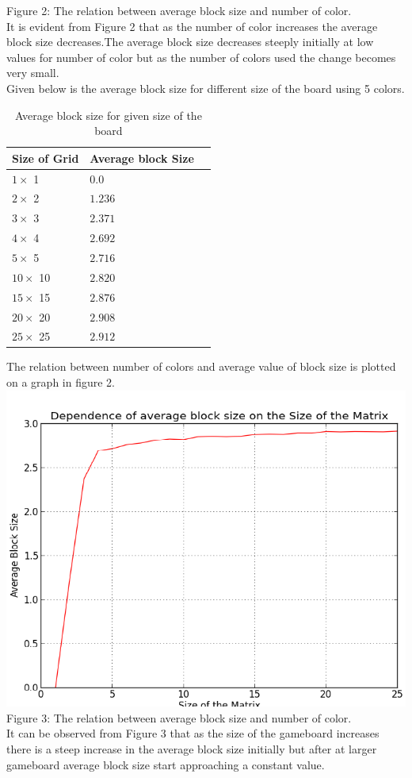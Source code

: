 \documentclass[twoside]{article}
\begin{document}
\begin{multicols}{2}
{\footnotesize Figure 2: The relation between average block size and number of color.\\}
It is evident from Figure 2 that as the number of color increases the average block size decreases.The average block size decreases steeply initially at low values for number of color but as the number of colors used the change becomes very small.\\
Given below is the average block size for different size of the board using 5 colors.
\begin{table}[H]
\caption{Average block size for given size of the board}
\centering
\begin{tabular}{llr}
\toprule
\cmidrule(r){1-2}
Size of Grid & Average block Size \\
\midrule
$1 \times$ 1 & $ 0.0 $ \\
$2 \times$ 2 & $ 1.236 $ \\
$3 \times$ 3 & $ 2.371$ \\
$4 \times$ 4 & $ 2.692 $ \\
$5 \times$ 5 & $ 2.716$ \\
$10 \times$ 10 & $ 2.820$ \\
$15 \times$ 15 & $ 2.876$ \\
$20 \times$ 20 & $ 2.908 $ \\
$25 \times$ 25 & $ 2.912 $ \\
\bottomrule
\end{tabular}
\end{table}
The relation between number of colors and average value of block size is plotted on a graph in figure 2.
\includegraphics[scale=0.4]{sizeblock}
{\footnotesize Figure 3: The relation between average block size and number of color.\\}
It can be observed from Figure 3 that as the size of the gameboard  increases there is a steep increase in the  average block size initially but after at larger gameboard average block size start approaching a constant value.\\





\end{multicols}
\end{document}
